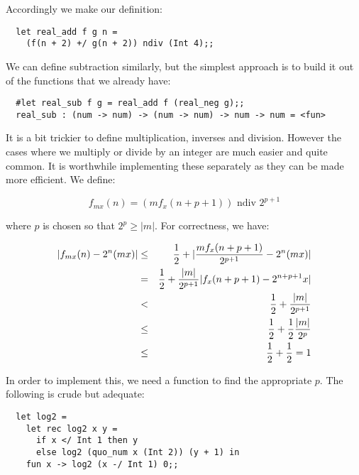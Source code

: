 \noindent Accordingly we make our definition:

\begin{boxed}\begin{verbatim}
  let real_add f g n =
    (f(n + 2) +/ g(n + 2)) ndiv (Int 4);;
\end{verbatim}\end{boxed}

We can define subtraction similarly, but the simplest approach is to build it
out of the functions that we already have:

\begin{boxed}\begin{verbatim}
  #let real_sub f g = real_add f (real_neg g);;
  real_sub : (num -> num) -> (num -> num) -> num -> num = <fun>
\end{verbatim}\end{boxed}

It is a bit trickier to define multiplication, inverses and division. However
the cases where we multiply or divide by an integer are much easier and quite
common. It is worthwhile implementing these separately as they can be made more
efficient. We define:

$$ f_{m x}(n) = (m f_x(n+p+1)) \mbox{ ndiv } 2^{p+1} $$

\noindent where $p$ is chosen so that $2^p \geq |m|$. For correctness, we have:

\begin{eqnarray*}
|f_{m x}(n) - 2^n (m x)|
& \leq & {1 \over 2} + |{m f_x(n+p+1) \over 2^{p+1}} - 2^n (m x)|       \\
& =    & {1 \over 2} + {|m| \over 2^{p+1}} |f_x(n+p+1) - 2^{n+p+1} x|   \\
& <    & {1 \over 2} + {|m| \over 2^{p+1}}                              \\
& \leq & {1 \over 2} + {1 \over 2} {|m| \over 2^p}                      \\
& \leq & {1 \over 2} + {1 \over 2} = 1
\end{eqnarray*}

In order to implement this, we need a function to find the appropriate $p$. The
following is crude but adequate:

\begin{boxed}\begin{verbatim}
  let log2 =
    let rec log2 x y =
      if x </ Int 1 then y
      else log2 (quo_num x (Int 2)) (y + 1) in
    fun x -> log2 (x -/ Int 1) 0;;
\end{verbatim}\end{boxed}

